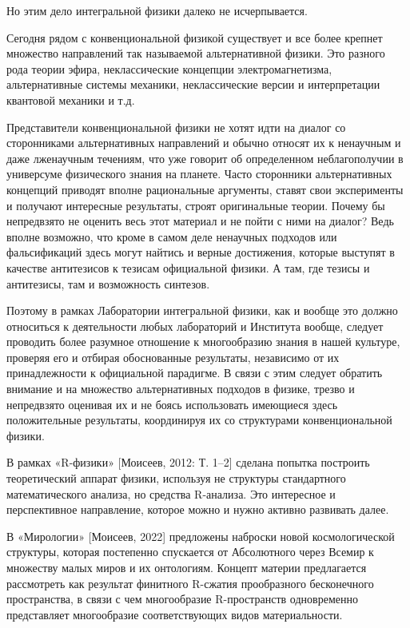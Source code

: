     Но этим дело интегральной физики далеко не исчерпывается.

    Сегодня рядом с конвенциональной физикой существует и все более крепнет множество направлений так называемой альтернативной физики. Это разного рода теории эфира, неклассические концепции электромагнетизма, альтернативные системы механики, неклассические версии и интерпретации квантовой механики и т.д.

    Представители конвенциональной физики не хотят идти на диалог со сторонниками альтернативных направлений и обычно относят их к ненаучным и даже лженаучным течениям, что уже говорит об определенном неблагополучии в универсуме физического знания на планете. Часто сторонники альтернативных концепций приводят вполне рациональные аргументы, ставят свои эксперименты и получают интересные результаты, строят оригинальные теории. Почему бы непредвзято не оценить весь этот материал и не пойти с ними на диалог? Ведь вполне возможно, что кроме в самом деле ненаучных подходов или фальсификаций здесь могут найтись и верные достижения, которые выступят в качестве антитезисов к тезисам официальной физики. А там, где тезисы и антитезисы, там и возможность синтезов.

    Поэтому в рамках Лаборатории интегральной физики, как и вообще это должно относиться к деятельности любых лабораторий и Института вообще, следует проводить более разумное отношение к многообразию знания в нашей культуре, проверяя его и отбирая обоснованные результаты, независимо от их принадлежности к официальной парадигме. В связи с этим следует обратить внимание и на множество альтернативных подходов в физике, трезво и непредвзято оценивая их и не боясь использовать имеющиеся здесь положительные результаты, координируя их со структурами конвенциональной физики.

    В рамках «R-физики» [Моисеев, 2012: Т. 1–2] сделана попытка построить теоретический аппарат физики, используя не структуры стандартного математического анализа, но средства R-анализа. Это интересное и перспективное направление, которое можно и нужно активно развивать далее.

    В «Мирологии» [Моисеев, 2022] предложены наброски новой космологической структуры, которая постепенно спускается от Абсолютного через Всемир к множеству малых миров и их онтологиям. Концепт материи предлагается рассмотреть как результат финитного R-сжатия прообразного бесконечного пространства, в связи с чем многообразие R-пространств одновременно представляет многообразие соответствующих видов материальности.

